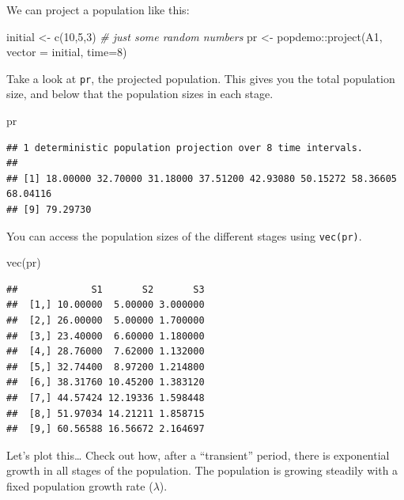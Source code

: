 \documentclass[
  a4paper]{book}
\newenvironment{Shaded}{\begin{snugshade}}{\end{snugshade}}
\newcommand{\AttributeTok}[1]{\textcolor[rgb]{0.77,0.63,0.00}{#1}}
\newcommand{\CommentTok}[1]{\textcolor[rgb]{0.56,0.35,0.01}{\textit{#1}}}
\newcommand{\DecValTok}[1]{\textcolor[rgb]{0.00,0.00,0.81}{#1}}
\newcommand{\FunctionTok}[1]{\textcolor[rgb]{0.00,0.00,0.00}{#1}}
\newcommand{\NormalTok}[1]{#1}
\newcommand{\OtherTok}[1]{\textcolor[rgb]{0.56,0.35,0.01}{#1}}
\newcommand{\SpecialCharTok}[1]{\textcolor[rgb]{0.00,0.00,0.00}{#1}}
\begin{document}
We can project a population like this:

\begin{Shaded}
\begin{Highlighting}[]
\NormalTok{initial }\OtherTok{\textless{}{-}} \FunctionTok{c}\NormalTok{(}\DecValTok{10}\NormalTok{,}\DecValTok{5}\NormalTok{,}\DecValTok{3}\NormalTok{) }\CommentTok{\# just some random numbers}
\NormalTok{pr }\OtherTok{\textless{}{-}}\NormalTok{ popdemo}\SpecialCharTok{::}\FunctionTok{project}\NormalTok{(A1, }\AttributeTok{vector =}\NormalTok{ initial, }\AttributeTok{time=}\DecValTok{8}\NormalTok{)}
\end{Highlighting}
\end{Shaded}

Take a look at \texttt{pr}, the projected population. This gives you the
total population size, and below that the population sizes in each
stage.

\begin{Shaded}
\begin{Highlighting}[]
\NormalTok{pr}
\end{Highlighting}
\end{Shaded}

\begin{verbatim}
## 1 deterministic population projection over 8 time intervals.
## 
## [1] 18.00000 32.70000 31.18000 37.51200 42.93080 50.15272 58.36605 68.04116
## [9] 79.29730
\end{verbatim}

You can access the population sizes of the different stages using
\texttt{vec(pr)}.

\begin{Shaded}
\begin{Highlighting}[]
\FunctionTok{vec}\NormalTok{(pr)}
\end{Highlighting}
\end{Shaded}

\begin{verbatim}
##             S1       S2       S3
##  [1,] 10.00000  5.00000 3.000000
##  [2,] 26.00000  5.00000 1.700000
##  [3,] 23.40000  6.60000 1.180000
##  [4,] 28.76000  7.62000 1.132000
##  [5,] 32.74400  8.97200 1.214800
##  [6,] 38.31760 10.45200 1.383120
##  [7,] 44.57424 12.19336 1.598448
##  [8,] 51.97034 14.21211 1.858715
##  [9,] 60.56588 16.56672 2.164697
\end{verbatim}

Let's plot this\ldots{} Check out how, after a ``transient'' period,
there is exponential growth in all stages of the population. The
population is growing steadily with a fixed population growth rate
(\(\lambda\)).
\end{document}
